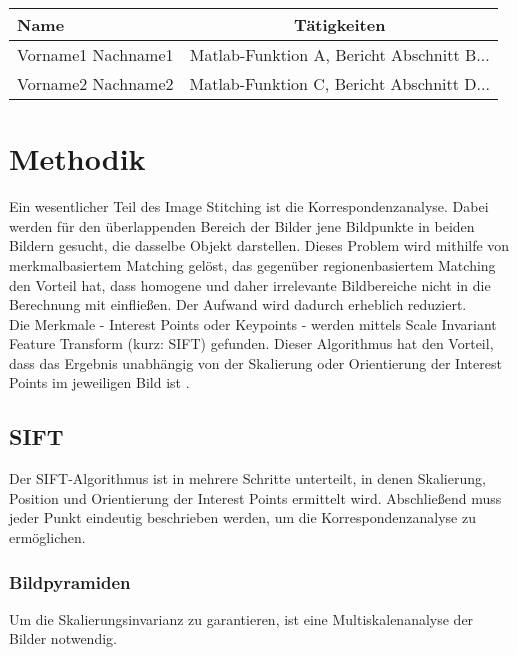 \documentclass[deutsch]{scrartcl}
\begin{document}
\begin{center}
  \begin{tabular}{ |l | c | }
    \hline
  Name & Tätigkeiten\\
    \hline
		Vorname1 Nachname1 & Matlab-Funktion A, Bericht Abschnitt B...\\
		\hline
		Vorname2 Nachname2 & Matlab-Funktion C, Bericht Abschnitt D...\\
		\hline
  \end{tabular}
\end{center}


\newpage
\section{Methodik}
Ein wesentlicher Teil des Image Stitching ist die Korrespondenzanalyse. Dabei werden für den überlappenden Bereich der Bilder jene Bildpunkte in beiden Bildern gesucht, die dasselbe Objekt darstellen. Dieses Problem wird mithilfe von merkmalbasiertem Matching gelöst, das gegenüber regionenbasiertem Matching den Vorteil hat, dass homogene und daher irrelevante Bildbereiche nicht in die Berechnung mit einfließen. Der Aufwand wird dadurch erheblich reduziert. \cite{evc14} \\
Die Merkmale - Interest Points oder Keypoints - werden mittels Scale Invariant Feature Transform (kurz: SIFT) \cite{lowe04} gefunden. Dieser Algorithmus hat den Vorteil, dass das Ergebnis unabhängig von der Skalierung oder Orientierung der Interest Points im jeweiligen Bild ist \cite{evc14}.

\subsection{SIFT}
Der SIFT-Algorithmus ist in mehrere Schritte unterteilt, in denen Skalierung, Position und Orientierung der Interest Points ermittelt wird. Abschließend muss jeder Punkt eindeutig beschrieben werden, um die Korrespondenzanalyse zu ermöglichen.

\subsubsection{Bildpyramiden}
Um die Skalierungsinvarianz zu garantieren, ist eine Multiskalenanalyse der Bilder notwendig. 
\end{document}
